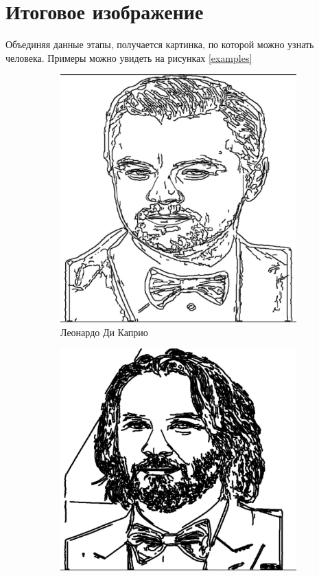 \documentclass[a4paper, 11pt]{article}
\begin{document}
\section{Итоговое изображение}
Объединяя данные этапы, получается картинка, по которой можно узнать человека. Примеры можно увидеть на рисунках \ref{examples}
\begin{figure}[h!]
	\centering
	\begin{subfigure}{0.49\linewidth}
		\includegraphics[width=\linewidth]{"Dicaprio.jpeg"}
		\caption{Леонардо Ди Каприо} \label{dicaprio}
	\end{subfigure}
	\begin{subfigure}{0.49\linewidth}
		\includegraphics[width=\linewidth]{"Kianu_Rivz.jpeg"}

\end{subfigure}
\end{figure}
\end{document}
